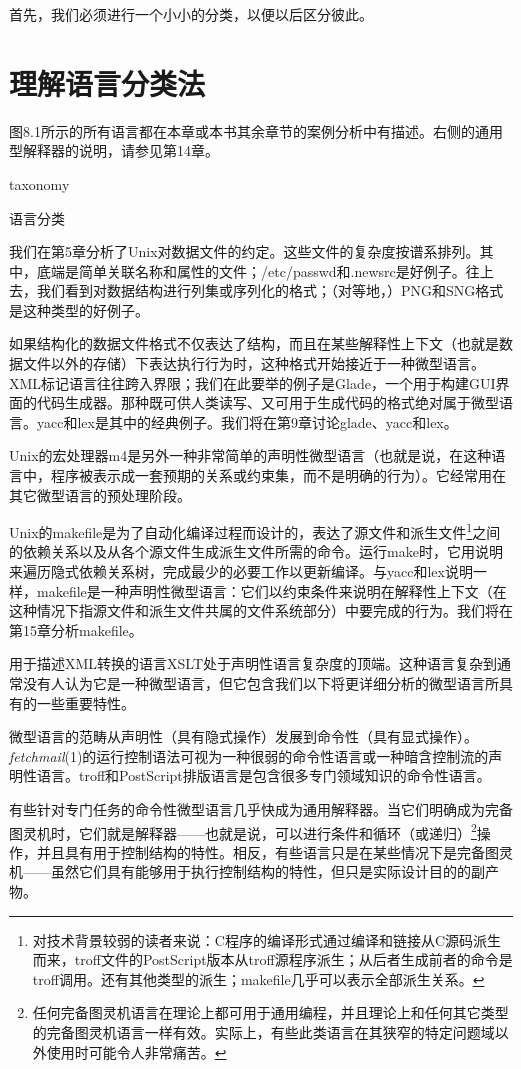 \documentclass[12pt,oneside]{book}
\begin{document}
\begin{common-format}
首先，我们必须进行一个小小的分类，以便以后区分彼此。

\section{理解语言分类法}
图8.1所示的所有语言都在本章或本书其余章节的案例分析中有描述。右侧的通用型解释器的说明，请参见第14章。

\begin{linefig}{taxonomy}
\caption{语言分类}
\label{fig:taxonomy}
\end{linefig}

我们在第5章分析了Unix对数据文件的约定。这些文件的复杂度按谱系排列。其中，底端是简单关联名称和属性的文件；/etc/passwd和.newsrc是好例子。往上去，我们看到对数据结构进行列集或序列化的格式；（对等地，）PNG和SNG格式是这种类型的好例子。

如果结构化的数据文件格式不仅表达了结构，而且在某些解释性上下文（也就是数据文件以外的存储）下表达执行行为时，这种格式开始接近于一种微型语言。XML标记语言往往跨入界限；我们在此要举的例子是Glade，一个用于构建GUI界面的代码生成器。那种既可供人类读写、又可用于生成代码的格式绝对属于微型语言。yacc和lex是其中的经典例子。我们将在第9章讨论glade、yacc和lex。

Unix的宏处理器m4是另外一种非常简单的声明性微型语言（也就是说，在这种语言中，程序被表示成一套预期的关系或约束集，而不是明确的行为）。它经常用在其它微型语言的预处理阶段。

Unix的makefile是为了自动化编译过程而设计的，表达了源文件和派生文件\footnote{对技术背景较弱的读者来说：C程序的编译形式通过编译和链接从C源码派生而来，troff文件的PostScript版本从troff源程序派生；从后者生成前者的命令是troff调用。还有其他类型的派生；makefile几乎可以表示全部派生关系。}之间的依赖关系以及从各个源文件生成派生文件所需的命令。运行make时，它用说明来遍历隐式依赖关系树，完成最少的必要工作以更新编译。与yacc和lex说明一样，makefile是一种声明性微型语言：它们以约束条件来说明在解释性上下文（在这种情况下指源文件和派生文件共属的文件系统部分）中要完成的行为。我们将在第15章分析makefile。

用于描述XML转换的语言XSLT处于声明性语言复杂度的顶端。这种语言复杂到通常没有人认为它是一种微型语言，但它包含我们以下将更详细分析的微型语言所具有的一些重要特性。

微型语言的范畴从声明性（具有隐式操作）发展到命令性（具有显式操作）。\textit{fetchmail}(1)的运行控制语法可视为一种很弱的命令性语言或一种暗含控制流的声明性语言。troff和PostScript排版语言是包含很多专门领域知识的命令性语言。

有些针对专门任务的命令性微型语言几乎快成为通用解释器。当它们明确成为完备图灵机时，它们就是解释器——也就是说，可以进行条件和循环（或递归）\footnote{任何完备图灵机语言在理论上都可用于通用编程，并且理论上和任何其它类型的完备图灵机语言一样有效。实际上，有些此类语言在其狭窄的特定问题域以外使用时可能令人非常痛苦。}操作，并且具有用于控制结构的特性。相反，有些语言只是在某些情况下是完备图灵机——虽然它们具有能够用于执行控制结构的特性，但只是实际设计目的的副产物。


\end{common-format}
\end{document}
